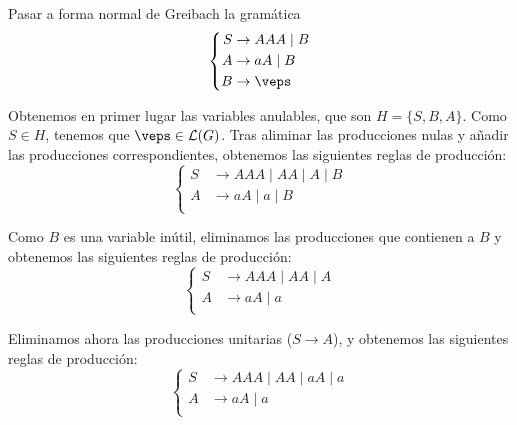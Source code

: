 \begin{ejercicio}\label{ej:1.4.12}
    Pasar a forma normal de Greibach la gramática
    \begin{equation*}
        \left\{
            \begin{aligned}
                S &\rightarrow AAA \mid B\\
                A &\rightarrow aA \mid B\\
                B &\rightarrow \veps
            \end{aligned}
        \right.
    \end{equation*}

    Obtenemos en primer lugar las variables anulables, que son $H=\{S,B,A\}$. Como $S\in H$, tenemos que $\veps\in \cc{L}(G)$.
    Tras aliminar las producciones nulas y añadir las producciones correspondientes, obtenemos las siguientes reglas de producción:
    \begin{equation*}
        \left\{
            \begin{aligned}
                S &\rightarrow AAA \mid AA\mid A \mid B\\
                A &\rightarrow aA \mid a\mid B\\
            \end{aligned}
        \right.
    \end{equation*}

    Como $B$ es una variable inútil, eliminamos las producciones que contienen a $B$ y obtenemos las siguientes reglas de producción:
    \begin{equation*}
        \left\{
            \begin{aligned}
                S &\rightarrow AAA \mid AA\mid A\\
                A &\rightarrow aA \mid a\\
            \end{aligned}
        \right.
    \end{equation*}


    Eliminamos ahora las producciones unitarias ($S\rightarrow A$), y obtenemos las siguientes reglas de producción:
    \begin{equation*}
        \left\{
            \begin{aligned}
                S &\rightarrow AAA \mid AA\mid aA\mid a\\
                A &\rightarrow aA \mid a\\
            \end{aligned}
        \right.
    \end{equation*}
\end{ejercicio}

